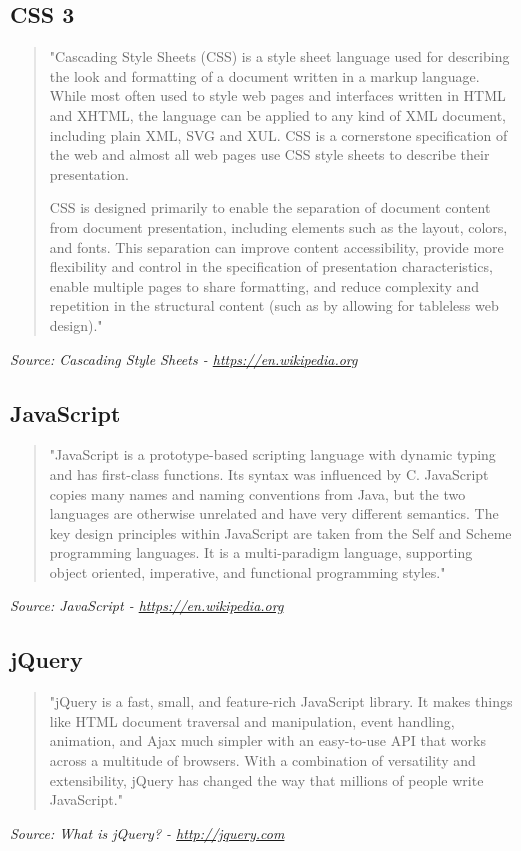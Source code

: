 \subsection{CSS 3}
\begin{quote}
"Cascading Style Sheets (CSS) is a style sheet language used for describing the look and formatting of a document written in a markup language. While most often used to style web pages and interfaces written in HTML and XHTML, the language can be applied to any kind of XML document, including plain XML, SVG and XUL. CSS is a cornerstone specification of the web and almost all web pages use CSS style sheets to describe their presentation.

CSS is designed primarily to enable the separation of document content from document presentation, including elements such as the layout, colors, and fonts. This separation can improve content accessibility, provide more flexibility and control in the specification of presentation characteristics, enable multiple pages to share formatting, and reduce complexity and repetition in the structural content (such as by allowing for tableless web design)."
\end{quote}
\textit{Source: Cascading Style Sheets - \url{https://en.wikipedia.org}}

\subsection{JavaScript}
\begin{quote}
"JavaScript is a prototype-based scripting language with dynamic typing and has first-class functions. Its syntax was influenced by C. JavaScript copies many names and naming conventions from Java, but the two languages are otherwise unrelated and have very different semantics. The key design principles within JavaScript are taken from the Self and Scheme programming languages. It is a multi-paradigm language, supporting object oriented, imperative, and functional programming styles."
\end{quote}
\textit{Source: JavaScript - \url{https://en.wikipedia.org}}

\subsection{jQuery}
\begin{quote}
"jQuery is a fast, small, and feature-rich JavaScript library. It makes things like HTML document traversal and manipulation, event handling, animation, and Ajax much simpler with an easy-to-use API that works across a multitude of browsers. With a combination of versatility and extensibility, jQuery has changed the way that millions of people write JavaScript."
\end{quote}
\textit{Source: What is jQuery? - \url{http://jquery.com}}

